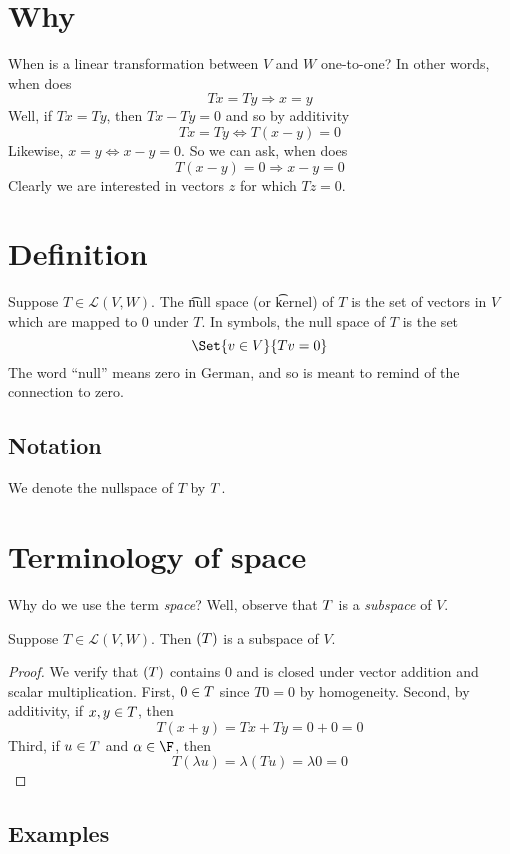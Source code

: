 
\section*{Why}

When is a linear transformation between $V$ and $W$ one-to-one?
In other words, when does
\[
Tx = Ty \Rightarrow x = y
\]
Well, if $Tx = Ty$, then $Tx - Ty = 0$ and so by additivity
\[
Tx = Ty \iff T(x - y) = 0
\]
Likewise, $x = y \iff x - y = 0$.
So we can ask, when does
\[
T(x - y) = 0 \Rightarrow x - y = 0
\]
Clearly we are interested in vectors $z$ for which $Tz = 0$.

\section*{Definition}

Suppose $T \in \mathcal{L} (V, W)$.
The \t{null space} (or \t{kernel}) of $T$ is the set of vectors in $V$ which are mapped to $0$ under $T$.
In symbols, the null space of $T$ is the set
\[
\Set{v \in V}{Tv = 0}
\]
The word ``null'' means zero in German, and so is meant to remind of the connection to zero.

\subsection*{Notation}

We denote the nullspace of $T$ by $\null T$.

\section*{Terminology of space}

Why do we use the term \textit{space}?
Well, observe that $\null T$ is a \textit{subspace} of $V$.

\begin{proposition}
Suppose $T \in \mathcal{L} (V, W)$.
Then $\null(T)$ is a subspace of $V$.
\end{proposition}

\begin{proof}We verify that $\null(T)$ contains $0$ and is closed under vector addition and scalar multiplication.
First, $0 \in \null T$ since $T0 = 0$ by homogeneity.
Second, by additivity, if $x, y \in \null T$, then
\[
T(x + y) = Tx + Ty = 0 + 0 = 0
\]
Third, if $u \in \null T$ and $\alpha  \in \F $, then
\[
T(\lambda u) = \lambda (Tu) = \lambda 0 = 0
\]\end{proof}
\subsection*{Examples}

